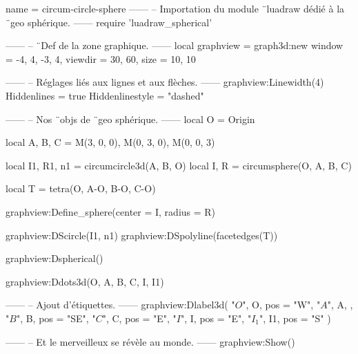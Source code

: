 \documentclass{standalone}
\begin{document}
\begin{luadraw}{name = circum-circle-sphere}
------
-- Importation du module ¨luadraw dédié à la ¨geo sphérique.
------
require 'luadraw_spherical'

------
-- ¨Def de la zone graphique.
------
local graphview = graph3d:new{
  window  = {-4, 4, -3, 4},
  viewdir = {30, 60},
  size    = {10, 10}
}

------
-- Réglages liés aux lignes et aux flèches.
------
graphview:Linewidth(4)
Hiddenlines     = true
Hiddenlinestyle = "dashed"

------
-- Nos ¨objs de ¨geo sphérique.
------
local O = Origin

local A, B, C = M(3, 0, 0), M(0, 3, 0), M(0, 0, 3)

local I1, R1, n1 = circumcircle3d(A, B, O)
local I, R       = circumsphere(O, A, B, C)

local T = tetra(O, A-O, B-O, C-O)

graphview:Define_sphere({center = I, radius = R})

graphview:DScircle({I1, n1})
graphview:DSpolyline(facetedges(T))

graphview:Dspherical()

graphview:Ddots3d({O, A, B, C, I, I1})

------
-- Ajout d'étiquettes.
------
graphview:Dlabel3d(
  "$O$", O, {pos = "W"},
  "$A$", A, {},
  "$B$", B, {pos = "SE"},
  "$C$", C, {pos = "E"},
  "$I$", I, {pos = "E"},
  "$I_1$", I1, {pos = "S"}
)

------
-- Et le merveilleux se révèle au monde.
------
graphview:Show()
\end{luadraw}
\end{document}
